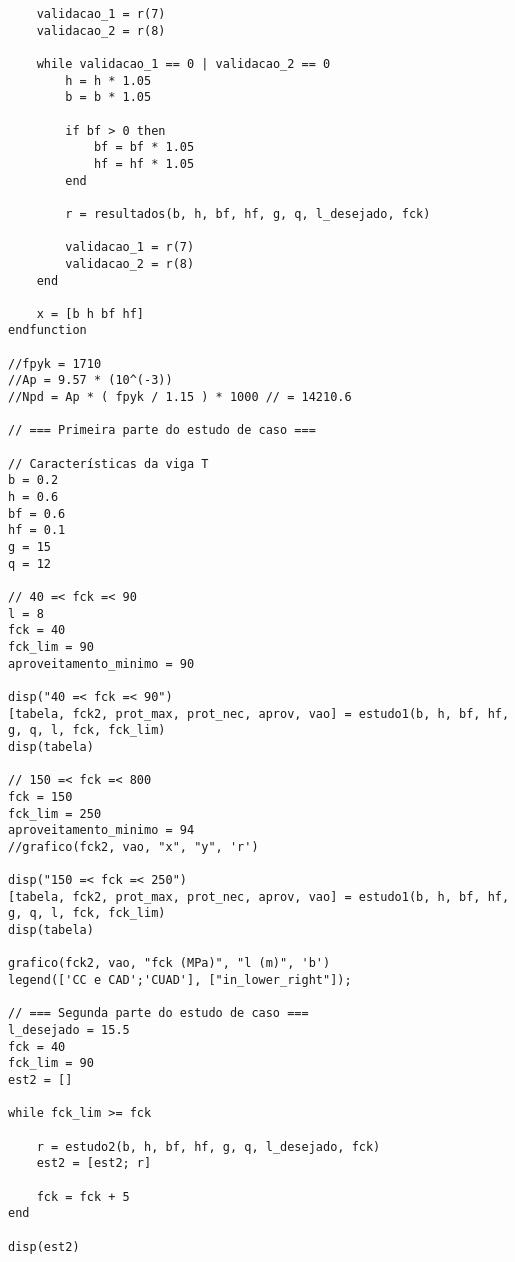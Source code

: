 \documentclass[
	12pt,				%
	openright,			%
	oneside,			%
	a4paper,			%
	chapter=TITLE,		%
	english,			%
	french,				%
	spanish,			%
	brazil				%
	]{abntex2}
\begin{document}
\begin{apendicesenv}
\begin{lstlisting}
    validacao_1 = r(7)
    validacao_2 = r(8)

    while validacao_1 == 0 | validacao_2 == 0
        h = h * 1.05
        b = b * 1.05
        
        if bf > 0 then
            bf = bf * 1.05
            hf = hf * 1.05
        end

        r = resultados(b, h, bf, hf, g, q, l_desejado, fck)

        validacao_1 = r(7)
        validacao_2 = r(8)
    end
    
    x = [b h bf hf]
endfunction

//fpyk = 1710
//Ap = 9.57 * (10^(-3))
//Npd = Ap * ( fpyk / 1.15 ) * 1000 // = 14210.6

// === Primeira parte do estudo de caso ===

// Características da viga T
b = 0.2
h = 0.6
bf = 0.6
hf = 0.1
g = 15
q = 12

// 40 =< fck =< 90
l = 8
fck = 40
fck_lim = 90
aproveitamento_minimo = 90

disp("40 =< fck =< 90")
[tabela, fck2, prot_max, prot_nec, aprov, vao] = estudo1(b, h, bf, hf, g, q, l, fck, fck_lim)
disp(tabela)

// 150 =< fck =< 800
fck = 150
fck_lim = 250
aproveitamento_minimo = 94
//grafico(fck2, vao, "x", "y", 'r')

disp("150 =< fck =< 250")
[tabela, fck2, prot_max, prot_nec, aprov, vao] = estudo1(b, h, bf, hf, g, q, l, fck, fck_lim)
disp(tabela)

grafico(fck2, vao, "fck (MPa)", "l (m)", 'b')
legend(['CC e CAD';'CUAD'], ["in_lower_right"]);

// === Segunda parte do estudo de caso ===
l_desejado = 15.5
fck = 40
fck_lim = 90
est2 = []

while fck_lim >= fck

    r = estudo2(b, h, bf, hf, g, q, l_desejado, fck)
    est2 = [est2; r]

    fck = fck + 5
end

disp(est2)

\end{lstlisting}

\end{apendicesenv}
%
%
%
\end{document}
